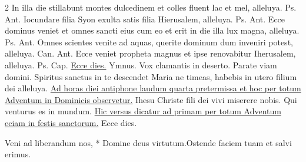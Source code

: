 \begin{multicols*}{2}
 In illa die stillabunt montes dulcedinem et colles fluent lac et mel, alleluya. {\color{Red} Ps.}  {\color{Red} Ant.} Iocundare filia Syon exulta satis filia Hierusalem, alleluya. {\color{Red} Ps.}  {\color{Red} Ant.} Ecce dominus veniet et omnes sancti eius cum eo et erit in die illa lux magna, alleluya. {\color{Red} Ps.}  {\color{Red} Ant.} Omnes scientes venite ad aquas, querite dominum dum inveniri potest, alleluya. {\color{Red} Can.}  {\color{Red} Ant.} Ecce veniet propheta magnus et ipse renovabitur Iherusalem, alleluya. {\color{Red} Ps.}  {\color{Red} Cap.} \hyperlink{ecce-dies-capitulum}{Ecce dies.} {\color{Red} Ymnus.}
\newline \V Vox clamantis in deserto.
\newline \R Parate viam domini.
 Spiritus sanctus in te descendet Maria ne timeas, habebis in utero filium dei alleluya.
\newline \ul{Ad horas diei antiphone laudum quarta pretermissa et hoc per totum Adventum in Dominicis observetur.}
 \R Ihesu Christe fili dei vivi miserere nobis. \V Qui venturus es in mundum.
\newline \ul{Hic versus dicatur ad primam per totum Adventum eciam in festis sanctorum.}
 Ecce dies.
\begin{responsory-breve}
{Veni ad liberandum nos, * Domine deus virtutum.}{Ostende faciem tuam et salvi erimus.}

\end{responsory-breve}
\end{multicols*}
